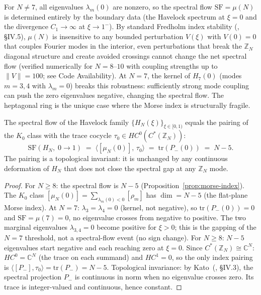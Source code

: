 \begin{remark}[Robustness of $\mu(N)$ and the $N = 7$ exception]
\label{rmk:topological-protection}
For $N \ne 7$, all eigenvalues $\lambda_m(0)$ are nonzero, so the
spectral flow $\mathrm{SF} = \mu(N)$ is determined entirely by the
boundary data (the Havelock spectrum at $\xi = 0$ and the
divergence $C_1 \to \infty$ at $\xi \to 1^-$).
By standard Fredholm index stability
(\citealt{Kato1995}, \S IV.5),
$\mu(N)$ is insensitive to any bounded perturbation $V(\xi)$
with $V(0) = 0$ that couples Fourier modes in the interior, even
perturbations that break the $\mathbb{Z}_N$ diagonal structure
and create avoided crossings cannot change the net spectral flow
(verified numerically for
$N = 8$--$10$ with coupling strengths up to $\|V\| = 100$;
see Code Availability).
At $N = 7$, the kernel of $H_7(0)$ (modes $m = 3, 4$ with
$\lambda_m = 0$) breaks this robustness:
sufficiently strong mode coupling can push the zero eigenvalues
negative, changing the spectral flow.
The heptagonal ring is the unique case where the Morse index is
structurally fragile.
\end{remark}

\begin{theorem}
\label{thm:index-pairing-k0}
The spectral flow of the Havelock family $\{H_N(\xi)\}_{\xi
\in [0,1)}$ equals the pairing of the $K_0$ class with the
trace cocycle $\tau_0 \in HC^0(C^*(\mathbb{Z}_N))$:
\begin{equation}\label{eq:index-pairing-sf}
  \mathrm{SF}(H_N,\; 0 \to 1)
  \;=\; \langle[\mu_N(0)],\, \tau_0\rangle
  \;=\; \mathrm{tr}(P_-(0))
  \;=\; N - 5.
\end{equation}
The pairing is a topological invariant: it is unchanged by
any continuous deformation of $H_N$ that does not close the
spectral gap at any $\mathbb{Z}_N$ mode.
\end{theorem}

\begin{proof}
For $N \ge 8$: the spectral flow is $N{-}5$
(Proposition~\ref{prop:morse-index}).
The $K_0$ class $[\mu_N(0)] =
\sum_{\lambda_m(0) < 0} [\rho_m]$ has $\dim = N{-}5$
(the flat-plane Morse index).
At $N = 7$: $\lambda_3 = \lambda_4 = 0$ (kernel, not
negative), so $\mathrm{tr}(P_-(0)) = 0$ and
$\mathrm{SF} = \mu(7) = 0$, no eigenvalue crosses from
negative to positive.
The two marginal eigenvalues $\lambda_{3,4} = 0$ become
positive for $\xi > 0$; this is the gapping of the
$N = 7$ threshold, not a spectral-flow event (no sign change).
For $N \ge 8$: $N{-}5$ eigenvalues start negative and each
reaching zero at $\xi = 0$.
Since $C^*(\mathbb{Z}_N) \cong \mathbb{C}^N$:
$HC^0 = \mathbb{C}^N$ (the trace on each summand) and
$HC^1 = 0$, so the only index pairing is
$\langle [P_-], \tau_0 \rangle = \mathrm{tr}(P_-) = N{-}5$.
Topological invariance: by Kato~(\citeyear{Kato1995},
\S IV.3), the spectral projection $P_-$ is
continuous in norm when no eigenvalue crosses zero.
Its trace is integer-valued and continuous, hence constant.
\end{proof}


